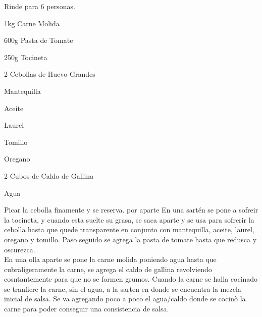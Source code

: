 
Rinde para 6 personas.\\

\begin{ingredientes}
\item 1kg Carne Molida
\item 600g Pasta de Tomate
\item 250g Tocineta
\item 2 Cebollas de Huevo Grandes
\item Mantequilla
\item Aceite
\item Laurel
\item Tomillo
\item Oregano
\item 2 Cubos de Caldo de Gallina
\item Agua
\end{ingredientes}
\preparacion
Picar la cebolla finamente y se reserva. por aparte En una sartén se pone a sofreir la tocineta, y cuando esta suelte su grasa, se saca aparte y se usa para sofrerir la cebolla hasta que quede transparente en conjunto con mantequilla, aceite, laurel, oregano y tomillo. Paso seguido se agrega la pasta de tomate hasta que redusca y oscurezca.\\

En una olla aparte se pone la carne molida poniendo agua hasta que cubraligeramente la carne, se agrega el caldo de gallina revolviendo cosntantemente para que no se formen grumos. Cuando la carne se halla cocinado se tranfiere la carne, sin el agua, a la sarten en donde se encuentra la mezcla inicial de salsa. Se va agregando poco a poco el agua/caldo donde se cocinò la carne para poder conseguir una consistencia de salsa.\\